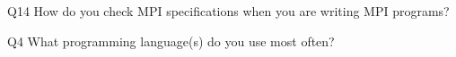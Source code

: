 \begin{description}%
\item{Q14} How do you check MPI specifications when you are writing MPI programs?%
\item{Q4} What programming language(s) do you use most often?%
\end{description}%
